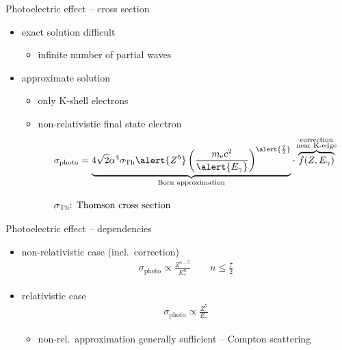 \documentclass[11pt,xcolor=dvipsnames,professionalfonts]{beamer}
\begin{document}
\begin{frame}{Photoelectric effect -- cross section}
	\begin{itemize}
		\setlength\itemsep{1.5em}
		\item exact solution difficult
		\begin{itemize}
			\item infinite number of partial waves
		\end{itemize}
		\item approximate solution
		\begin{itemize}
			\item only K-shell electrons
			\item non-relativistic final state electron			
			\begin{align*}
				&\sigma_\mathrm{photo} = \underbrace{4\sqrt{2} \alpha^4 \sigma_\mathrm{Th} \alert{Z^5}  \left( \frac{m_\mathrm{e}c^2}{\alert{E_\gamma}} \right)^{\alert{\frac{7}{2}}}}_{\text{Born approximation}} \cdot \, \overbrace{f(Z, E_\gamma)}^{\mathclap{\substack{\text{correction}\\\text{near K-edge}}}} \\[1em]
				&\sigma_\mathrm{Th}\text{: Thomson cross section}
			\end{align*}
		\end{itemize}
	\end{itemize}
\end{frame}


\begin{frame}{Photoelectric effect -- dependencies}
	\begin{itemize}
		\setlength\itemsep{1.5em}
		\item non-relativistic case (incl.\ correction)
		\begin{align*}
		\sigma_\mathrm{photo} \propto  \frac{Z^{4 \, \dots \, 5}}{E_\gamma^{n}} \qquad n \leq \frac{7}{2}
		\end{align*}
		
		\item relativistic case
		\begin{align*}
			\sigma_\mathrm{photo} \propto \frac{Z^5}{E_\gamma}
		\end{align*}
		\begin{itemize}
			\item non-rel.\ approximation generally sufficient -- Compton scattering
		\end{itemize} 
	\end{itemize}
\end{frame}
\end{document}
